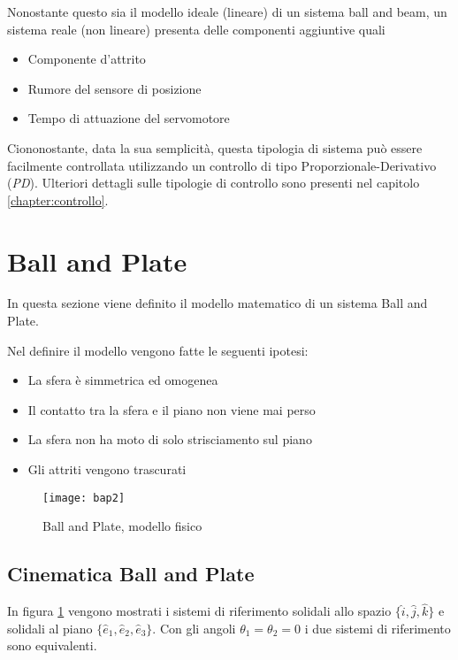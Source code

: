 Nonostante questo sia il modello ideale (lineare) di un sistema ball and beam, un sistema reale (non lineare) presenta delle componenti aggiuntive quali
\begin{itemize}[noitemsep]
	\item Componente d'attrito
	\item Rumore del sensore di posizione
	\item Tempo di attuazione del servomotore
\end{itemize}

Ciononostante, data la sua semplicità, questa tipologia di sistema può essere facilmente controllata utilizzando un controllo di tipo Proporzionale-Derivativo (\textit{PD}). Ulteriori dettagli sulle tipologie di controllo sono presenti nel capitolo \ref{chapter:controllo}.

\section{Ball and Plate}

In questa sezione viene definito il modello matematico di un sistema Ball and Plate.

Nel definire il modello vengono fatte le seguenti ipotesi:
\begin{itemize}[noitemsep]
	\item La sfera è simmetrica ed omogenea
	\item Il contatto tra la sfera e il piano non viene mai perso
	\item La sfera non ha moto di solo strisciamento sul piano
	\item Gli attriti vengono trascurati
\end{itemize}

\bigskip

\begin{figure}[ht]
	\centering
	\texttt{[image: bap2]}
	\caption{Ball and Plate, modello fisico}
	\label{figure:bap}
\end{figure}

\subsection{Cinematica Ball and Plate}

In figura \ref{figure:bap} vengono mostrati i sistemi di riferimento solidali allo spazio $\{\hat{i}, \hat{j}, \hat{k}\}$ e solidali al piano $\{\hat{e}_{1}, \hat{e}_{2}, \hat{e}_{3}\}$. Con gli angoli $\theta_{1} = \theta_{2} = 0$ i due sistemi di riferimento sono equivalenti.

